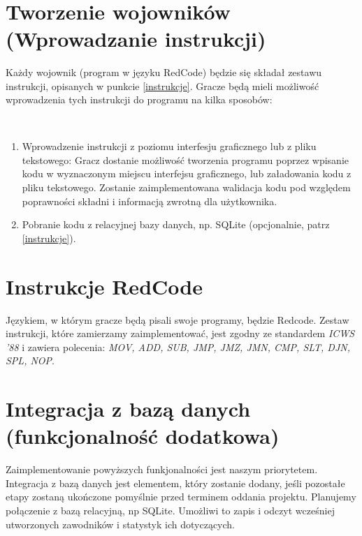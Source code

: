 \

\section{Tworzenie wojowników (Wprowadzanie instrukcji)}
Każdy wojownik (program w języku RedCode) będzie się składał zestawu instrukcji, opisanych w punkcie \ref{instrukcje}. Gracze będą mieli możliwość wprowadzenia tych instrukcji do programu na kilka sposobów:

\
\begin{enumerate}
	\item Wprowadzenie instrukcji z poziomu interfesju graficznego lub z pliku tekstowego:
	\newline
		Gracz dostanie możliwość tworzenia programu poprzez wpisanie kodu w wyznaczonym miejscu interfejsu graficznego, lub załadowania kodu z pliku tekstowego. Zostanie zaimplementowana walidacja kodu pod względem poprawności składni i informacją zwrotną dla użytkownika.
	
	\item Pobranie kodu z relacyjnej bazy danych, np. SQLite (opcjonalnie, patrz \ref{instrukcje}).
\end{enumerate}

\section{Instrukcje RedCode}
Językiem, w którym gracze będą pisali swoje programy, będzie Redcode. Zestaw instrukcji, które zamierzamy zaimplementować, jest zgodny ze standardem \textit{ICWS '88} i zawiera polecenia: \textit{MOV, ADD, SUB, JMP, JMZ, JMN, CMP, SLT, DJN, SPL, NOP}.
\label{instrukcje}

\section{Integracja z bazą danych (funkcjonalność dodatkowa)}

Zaimplementowanie powyższych funkjonalności jest naszym priorytetem. Integracja z bazą danych jest elementem, który zostanie dodany, jeśli pozostałe etapy zostaną ukończone pomyślnie przed terminem oddania projektu. Planujemy połączenie z bazą relacyjną, np SQLite. Umożliwi to zapis i odczyt wcześniej utworzonych zawodników i statystyk ich dotyczących.

\label{database}
